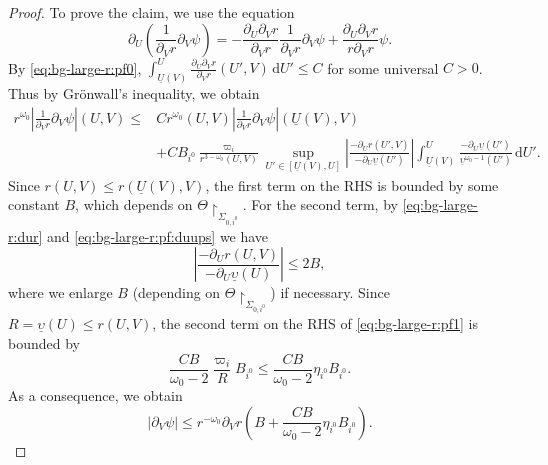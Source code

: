 \documentclass[10pt, reqno]{amsart}
\theoremstyle{definition}
\theoremstyle{remark}
\theoremstyle{conjecture}
\numberwithin{equation}{section}
\newcommand{\ud}{\mathrm{d}}
\newcommand{\rd}{\partial}
\newcommand{\0}{\emptyset}
\newcommand{\Sgm}{\Sigma}
\newcommand{\Tht}{\Theta}
\newcommand{\omg}{\omega}
\newcommand{\ups}{\upsilon}
\newcommand{\Abs}[1]{\left\vert #1 \right\vert}
\begin{document}
\begin{proof}
To prove the claim, we use the equation
\begin{equation} \label{eq:dUdvpsi}
	\rd_{U} \left(\frac{1}{\rd_{V} r} \rd_{V}  \psi \right) 
	= - \frac{\rd_{U} \rd_{V} r}{\rd_{V} r} \frac{1}{\rd_{V} r} \rd_{V} \psi + \frac{\rd_{U} \rd_{V} r}{r \rd_{V} r} \psi.
\end{equation}
By \eqref{eq:bg-large-r:pf0}, $\int_{\underline{U}(V)}^{U} \frac{\rd_{U} \rd_{V} r}{\rd_{V} r} (U', V) \, \ud U' \leq C$ for some universal $C>0$. Thus by Gr\"onwall's inequality, we obtain
\begin{equation} \label{eq:bg-large-r:pf1}
\begin{aligned}
	r^{\omg_{0}} \Abs{\frac{1}{\rd_{V} r} \rd_{V} \psi} (U, V)
	\leq & C  r^{\omg_{0}}(U, V) \Abs{\frac{1}{\rd_{V} r} \rd_{V} \psi} (\underline{U}(V), V)  \\
		& +  C B_{i^{0}}  \frac{\varpi_{i}}{r^{3-\omg_{0}}(U, V)} \sup_{U' \in [\underline{U}(V), U]} \Abs{\frac{-\rd_{U} r(U', V)}{-\rd_{U} \underline{\ups}(U')}}  \int_{\underline{U}(V)}^{U} \frac{-\rd_{U} \underline{\ups}(U')}{\underline{\ups}^{\omg_{0}-1}(U')} \, \ud U'.
\end{aligned}
\end{equation}
Since $r(U, V) \leq r(\underline{U}(V), V)$, the first term on the RHS is bounded by some constant $B$, which depends on $\Tht \restriction_{\Sgm_{0, i^{0}}}$. For the second term, by \eqref{eq:bg-large-r:dur} and \eqref{eq:bg-large-r:pf:duups} we have
\begin{equation*}
\Abs{\frac{-\rd_{U} r(U, V)}{-\rd_{U} \underline{\ups}(U)}} \leq 2 B,
\end{equation*}
where we enlarge $B$ (depending on $\Tht \restriction_{\Sgm_{0, i^{0}}}$) if necessary. Since $R = \underline{\ups}(U) \leq r(U, V)$, the second term on the RHS of \eqref{eq:bg-large-r:pf1} is bounded by
\begin{equation*}
	\frac{CB}{\omg_{0}-2} \frac{\varpi_{i}}{R} B_{i^{0}} \leq\frac{CB}{\omg_{0}-2} \eta_{i^{0}} B_{i^{0}}.
\end{equation*}
As a consequence, we obtain
\begin{equation*}
	\Abs{\rd_{V} \psi} \leq r^{-\omg_{0}} \rd_{V} r \left(B + \frac{C B}{\omg_{0}-2} \eta_{i^{0}} B_{i^{0}} \right).
\end{equation*}

\end{proof}
\end{document}
